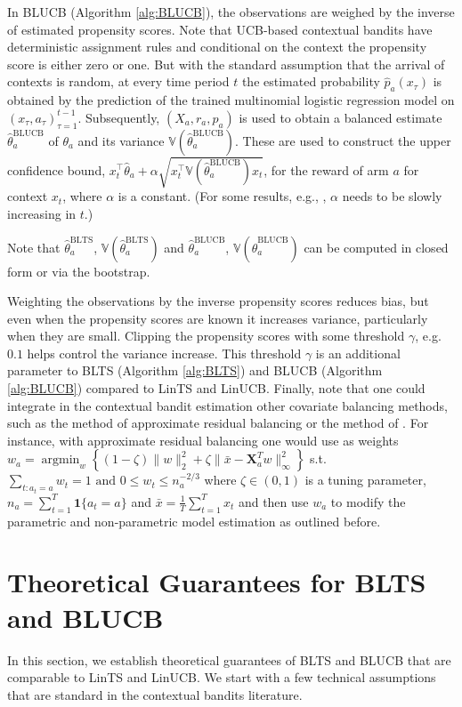 \documentclass[letterpaper]{article} %
\newcommand{\field}[1]{\mathbb{#1}}
\def\V{\field{V}}
\def\V{\mathbb{V}}
\DeclareMathOperator*{\argmin}{argmin}
\begin{document}
In BLUCB (Algorithm \ref{alg:BLUCB}), the observations are weighed by the inverse of estimated propensity scores.
Note that UCB-based contextual bandits have deterministic assignment rules and conditional on the context the propensity score is either zero or one.
But with the standard assumption that the arrival of contexts is random, at every time period $t$ the estimated probability $\hat{p}_a(x_\tau)$
is obtained by the prediction of the trained multinomial logistic regression model on  $(x_\tau, a_\tau)_{\tau=1}^{t-1}$.
Subsequently, $(X_a, r_a, \hat{p}_a)$ is used to obtain a balanced estimate $\hat{\theta}^{\text{BLUCB}}_a$ of $\theta_a$ and its variance $\V(\hat\theta^\text{BLUCB}_a)$. These are used to construct the upper confidence bound, $x_t^\top \hat{\theta}_a + \alpha \sqrt{x_t^\top \V(\hat\theta^\text{BLUCB}_a) x_t}$, for the reward of arm $a$ for context $x_t$,  where $\alpha$ is a constant. (For some results, e.g., \cite{auer2002using}, $\alpha$ needs to be slowly increasing in $t$.)

Note that $\hat{\theta}^\text{BLTS}_a$, $\V(\hat\theta^\text{BLTS}_a)$ and $\hat{\theta}^\text{BLUCB}_a$, $\V(\hat\theta^\text{BLUCB}_a)$ can be computed in closed form or via the bootstrap.

Weighting the observations by the inverse propensity scores reduces bias, but even when the propensity scores are known it increases variance, particularly when they are small. Clipping the propensity scores \cite{crump2009dealing} with some threshold  $\gamma$, e.g. $0.1$ helps control the variance increase. This threshold $\gamma$ is an additional parameter to BLTS (Algorithm \ref{alg:BLTS}) and BLUCB (Algorithm \ref{alg:BLUCB}) compared to LinTS and LinUCB.
Finally, note that one could integrate in the contextual bandit estimation other covariate balancing methods, such as the method of approximate residual balancing \cite{athey-arb} or the method of \cite{kallus-offline}.
For instance, with approximate residual balancing one would use as weights
$w_a = \argmin_w \left\{ (1- \zeta) \lVert w\rVert_2^2 + \zeta \lVert \bar{x} - \textbf{X}_a^T w \rVert_\infty^2\right\}$ s.t. $\sum_{t: a_t = a} w_t = 1 \text{ and } 0 \leq w_t \leq n_a^{-2/3}$
where $\zeta \in (0, 1)$ is a tuning parameter, $n_a =  \sum_{t = 1}^{T} \textbf{1} \{a_t = a\}$ and $\bar{x} = \frac{1}{T} \sum_{t = 1}^{T} x_t$ and then use $w_a$ to modify the parametric and non-parametric model estimation as outlined before.

\section{Theoretical Guarantees for BLTS and BLUCB} \label{theory}
In this section, we establish theoretical guarantees of BLTS and BLUCB that are comparable to LinTS and LinUCB. We start with a few technical assumptions that are standard in the contextual bandits literature.
\end{document}
